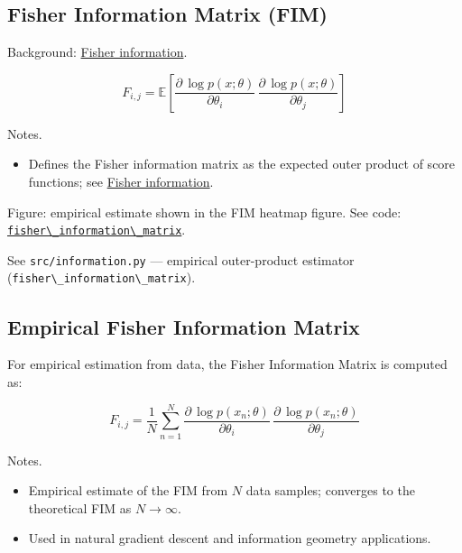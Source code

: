 \documentclass[
  10pt,
]{article}
\newcommand{\passthrough}[1]{#1}
\providecommand{\tightlist}{%
  \setlength{\itemsep}{0pt}\setlength{\parskip}{0pt}}
\begin{document}
\hypertarget{eq:fim}{%
\subsection{Fisher Information Matrix (FIM)}\label{eq:fim}}

Background:
\href{https://en.wikipedia.org/wiki/Fisher_information}{Fisher
information}.

\begin{equation}\label{eq:fim}
F_{i,j} = \mathbb{E}\left[ \frac{\partial \, \log p(x;\theta)}{\partial \theta_i}\, \frac{\partial \, \log p(x;\theta)}{\partial \theta_j} \right]
\end{equation}

Notes.

\begin{itemize}
\tightlist
\item
  Defines the Fisher information matrix as the expected outer product of
  score functions; see
  \href{https://en.wikipedia.org/wiki/Fisher_information}{Fisher
  information}.
\end{itemize}

Figure: empirical estimate shown in the FIM heatmap figure. See code:
\href{03_quadray_methods.md\#code:fisher_information_matrix}{\passthrough{\lstinline!fisher\_information\_matrix!}}.

See \passthrough{\lstinline!src/information.py!} --- empirical
outer-product estimator
(\passthrough{\lstinline!fisher\_information\_matrix!}).

\hypertarget{empirical-fisher-information-matrix}{%
\subsection{Empirical Fisher Information
Matrix}\label{empirical-fisher-information-matrix}}

For empirical estimation from data, the Fisher Information Matrix is
computed as:

\begin{equation}\label{eq:fim_empirical}
F_{i,j} = \frac{1}{N} \sum_{n=1}^{N} \frac{\partial \, \log p(x_n;\theta)}{\partial \theta_i}\, \frac{\partial \, \log p(x_n;\theta)}{\partial \theta_j}
\end{equation}

Notes.

\begin{itemize}
\tightlist
\item
  Empirical estimate of the FIM from \(N\) data samples; converges to
  the theoretical FIM as \(N \to \infty\).
\item
  Used in natural gradient descent and information geometry
  applications.
\end{itemize}
\end{document}
